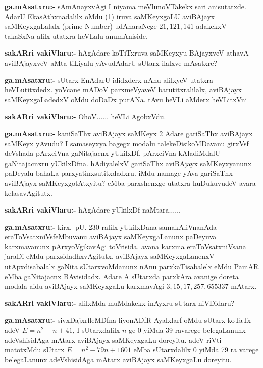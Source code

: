 \smallskip
\noindent
\textbf{ga.mAsatxru:-} sAmAnayxvAgi I niyama meVlunoVTakekx sari anisutatxde. AdarU EkasAthxnadalilx oMdu {\rm (1)} iruva saMKeyxgaLU aviBAjayx saMKeyxgaLalalx {\rm (prime Number)} udAharaNege $21, 121, 141$ adakekxV takaSxNa alilx utatxra heVLalu anumAniside.

\smallskip
\noindent
\textbf{sakARri vakiVlaru:-} hAgAdare koTiTxruva saMKeyxyu BAjayxveV athavA aviBAjayxveV aMta tiLiyalu yAvudAdarU sUtarx ilalxve mAsatxre?

\smallskip
\noindent
\textbf{ga.mAsatxru:-} sUtarx EnAdarU ididxderx nAnu alilxyeV utatxra heVLutitxdedx. yoVcane mADoV parxmeVyaveV barutitxralilalx, aviBAjayx saMKeyxgaLadedxV oMdu doDaDx purANa. tAvu heVLi aMderx heVLitxVni

\smallskip
\noindent
\textbf{sakARri vakiVlaru:-} OhoV$\ldots\ldots$ heVLi AgobxVdu.

\smallskip
\noindent
\textbf{ga.mAsatxru:-} kaniSaThx aviBAjayx saMKeyx {\rm 2} Adare gariSaThx aviBAjayx saMKeyx yAvudu? I samaseyxya bagegx modalu talekeDisikoMDavanu girxVsf deVshada pArxciVna gaNitajacnx yUkilxDf. pArxciVna kAladiMdalU gaNitajacnxru yUkilxDfna. hAdiyalelxV gariSaThx aviBAjayx saMKeyxyanunx paDeyalu bahaLa parxyatinxsutitxdadxru. iMdu namage yAva gariSaThx aviBAjayx saMKeyxgotAtxyitu? eMba parxshenxge utatxra huDukuvudeV avara kelasavAgitutx.

\smallskip
\noindent
\textbf{sakARri vakiVlaru:-} hAgAdare yUkilxDf naMtara$\ldots\ldots$

\smallskip
\noindent
\textbf{ga.mAsatxru:-} kirx.~pU. {\rm 230} ralilx yUkilxDana samakAliVnanAda eraToVsatxniVsf\break eMbuvanu aviBAjayx saMKeyxgaLanunx paDeyuva karxmavanunx pArxyoVgikavAgi toVrisida. avana karxma eraToVsatxniVsana jaraDi eMdu parxsidadhxvAgitutx. aviBAjayx saMKeyxgaLanenxV utApxdisabalalx gaNita sUtarxvoMdanunx nAnu parxkaTisabalelx eMdu PamAR eMba gaNita\-jacnx BAvisidadx. Adare A sUtarxda parxkAra avanige doreta modala aidu aviBAjayx saMKeyxgaLu karxmavAgi $3, 15, 17, 257, 655337$ mAtarx.

\smallskip
\noindent
\textbf{sakARri vakiVlaru:-} alilxMda muMdakekx inAyxru sUtarx niVDidaru?

\smallskip
\noindent
\textbf{ga.mAsatxru:-} sivxDajxrfleMDfna liyonADfR Ayalxlarf oMdu sUtarx koTaTx adeV $E=n^2-n+41$, I sUtarxdalilx $n$ ge {\rm 0} yiMda {\rm 39} ravarege belegaLanunx adeVshisidAga mAtarx aviBAjayx saMKeyxgaLu doreyitu. adeV riVti matotxMdu sUtarx $E=n^2-79n+1601$ eMba sUtarxdalilx {\rm 0} yiMda {\rm 79} ra varege belegaLanunx adeVshisidAga mAtarx aviBAjayx saMKeyxgaLu doreyitu.

